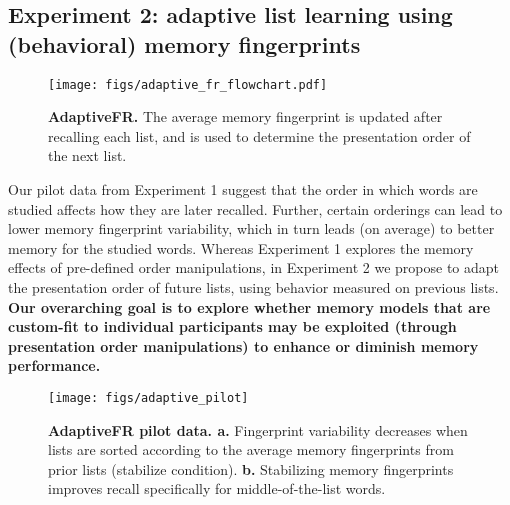 \subsection*{Experiment 2: adaptive list learning using (behavioral) memory fingerprints}
\begin{wrapfigure}[9]{R}{1.6in}
  \vspace{-25pt}
  \begin{center}
    \texttt{[image: figs/adaptive\_fr\_flowchart.pdf]}
  \end{center}
\vspace{-20pt}
  \caption{\footnotesize \textbf{AdaptiveFR.}  The average memory fingerprint is updated after recalling each list, and is used to determine the presentation order of the next list.}
  \label{fig:adaptiveFR_flowchart}
\end{wrapfigure}

Our pilot data from Experiment 1 suggest that the order in which words are studied affects how they are later recalled.  Further, certain orderings can lead to lower memory fingerprint variability, which in turn leads (on average) to better memory for the studied words.  Whereas Experiment 1 explores the memory effects of pre-defined order manipulations, in Experiment 2 we propose to adapt the presentation order of future lists, using behavior measured on previous lists.  \textbf{Our overarching goal is to explore whether memory models that are custom-fit to individual participants may be exploited (through presentation order manipulations) to enhance or diminish memory performance.}

\begin{wrapfigure}[24]{R}{2in}
  \vspace{-25pt}
  \begin{center}
    \texttt{[image: figs/adaptive\_pilot]}
  \end{center}
\vspace{-20pt}
  \caption{\footnotesize \textbf{AdaptiveFR pilot data. a.} Fingerprint variability decreases when lists are sorted according to the average memory fingerprints from prior lists (stabilize condition).  \textbf{b.}  Stabilizing memory fingerprints improves recall specifically for middle-of-the-list words.}
  \label{fig:adaptive_pilot}
\end{wrapfigure}

